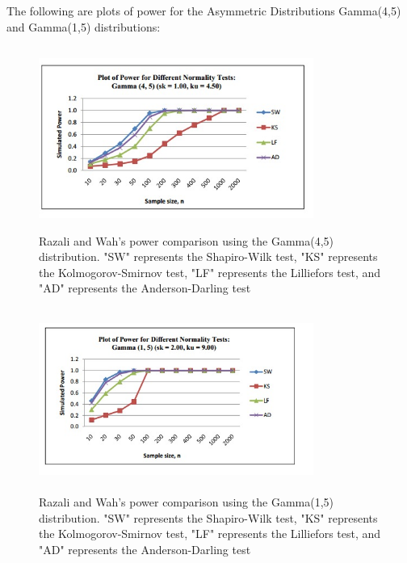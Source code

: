 \documentclass[letterpaper,english, 12pt]{article}
\begin{document}
The following are plots of power for the Asymmetric Distributions Gamma(4,5) and Gamma(1,5) distributions:

\begin{figure}[H]
	\centering
	\includegraphics[height=6cm,width=90mm]{pics/razali3.jpg}
	\caption{Razali and Wah's power comparison using the Gamma(4,5) distribution. "SW" represents the Shapiro-Wilk test, "KS" represents the Kolmogorov-Smirnov test, "LF" represents the Lilliefors test, and "AD" represents the Anderson-Darling test}
\end{figure}

\begin{figure}[H]
	\centering
	\includegraphics[height=6cm,width=90mm]{pics/razali4.jpg}
	\caption{Razali and Wah's power comparison using the Gamma(1,5) distribution. "SW" represents the Shapiro-Wilk test, "KS" represents the Kolmogorov-Smirnov test, "LF" represents the Lilliefors test, and "AD" represents the Anderson-Darling test}
\end{figure}
\end{document}

